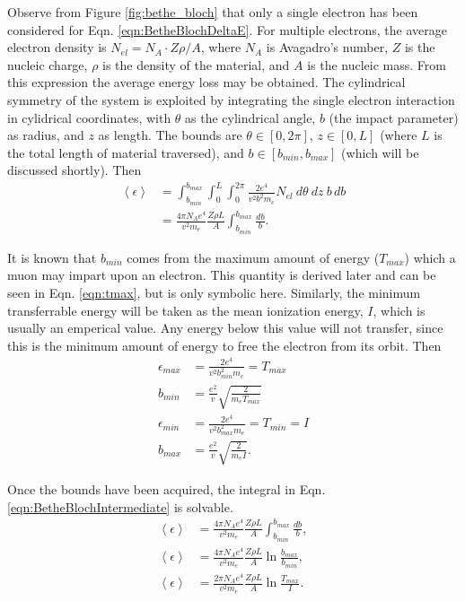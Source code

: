Observe from Figure \ref{fig:bethe_bloch} that only a single electron has been considered for Eqn. \ref{eqn:BetheBlochDeltaE}. For multiple electrons, the average electron density is $N_{el}=N_A\cdot Z\rho/A$, where $N_A$ is Avagadro's number, $Z$ is the nucleic charge, $\rho$ is the density of the material, and $A$ is the nucleic mass. From this expression the average energy loss may be obtained. The cylindrical symmetry of the system is exploited by integrating the single electron interaction in cylidrical coordinates, with $\theta$ as the cylindrical angle, $b$ (the impact parameter) as radius, and $z$ as length. The bounds are $\theta \in [0,2\pi]$, $z\in[0,L]$ (where $L$ is the total length of material traversed), and $b\in[b_{min},b_{max}]$ (which will be discussed shortly). Then
\begin{align}
\left<\epsilon\right>&=\int_{b_{min}} ^{b_{max}} \int_0 ^L \int_0 ^{2\pi}  \frac{2e^4}{v^2b^2m_e}N_{el}\: d\theta \: dz\: b \,db \nonumber\\
&=\frac{4\pi N_A e^4}{v^2 m_e}\frac{Z\rho L}{A}\int_{b_{min}} ^{b_{max}} \frac{db}{b}. \label{eqn:BetheBlochIntermediate}
\end{align}

It is known that $b_{min}$ comes from the maximum amount of energy ($T_{max}$) which a muon may impart upon an electron. This quantity is derived later and can be seen in Eqn. \ref{eqn:tmax}, but is only symbolic here. Similarly, the minimum transferrable energy will be taken as the mean ionization energy, $I$, which is usually an emperical value. Any energy below this value will not transfer, since this is the minimum amount of energy to free the electron from its orbit. Then
\begin{align*}
\epsilon_{max}&=\frac{2e^4}{v^2b_{min} ^2 m_e}=T_{max}\\
b_{min}&=\frac{e^2}{v}\sqrt{\frac{2}{m_e T_{max}}}\\[12pt]
\epsilon_{min}&=\frac{2e^4}{v^2b_{max} ^2 m_e}=T_{min}=I\\
b_{max}&=\frac{e^2}{v}\sqrt{\frac{2}{m_e I}}.
\end{align*}

Once the bounds have been acquired, the integral in Eqn. \ref{eqn:BetheBlochIntermediate} is solvable.
\begin{align}
\left<\epsilon\right> &= \frac{4\pi N_A e^4}{v^2 m_e} \frac{Z\rho L}{A}\int_{b_{min}} ^{b_{max}} \frac{db}{b},\nonumber\\
\left<\epsilon\right> &= \frac{4\pi N_A e^4}{v^2 m_e} \frac{Z\rho L}{A} \ln{\frac{b_{max}}{b_{min}}},\nonumber\\
\left<\epsilon\right> &= \frac{2\pi N_A e^4}{v^2 m_e} \frac{Z\rho L}{A} \ln{\frac{T_{max}}{I}} \label{eqn:BetheBlochClassical}.
\end{align}

